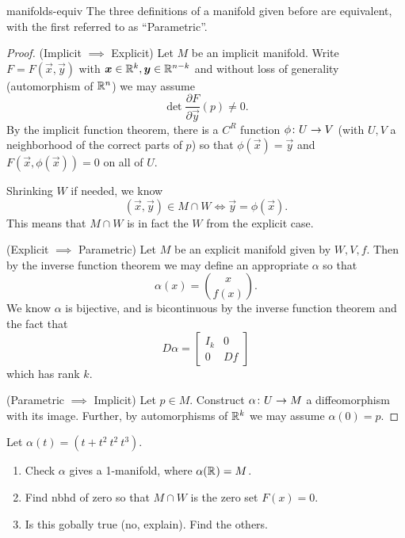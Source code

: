 \documentclass{article}
\begin{document}
\begin{theorem}{}{manifolds-equiv}
  The three definitions of a manifold given before are equivalent,
  with the first referred to as ``Parametric''.
\end{theorem}
\begin{proof}
  (Implicit $\implies$ Explicit)
  Let $M$ be an implicit manifold.
  Write $F = F(\vec{x}, \vec{y})$ with $\vec{x} \in \RR[k], \vec{y} \in \RR[n - k]$
  and without loss of generality (automorphism of $\RR[n]$) we may assume
  \[ \det \frac{\partial F}{\partial \vec{y}}(p) \ne 0. \]
  By the implicit function theorem, there is a $C^{R}$ function $\phi \from U \to V$
  (with $U, V$ a neighborhood of the correct parts of $p$)
  so that $\phi(\vec{x}) = \vec{y}$ and $F(\vec{x}, \phi(\vec{x})) = 0$ on all of $U$.

  Shrinking $W$ if needed, we know
  \[ (\vec{x}, \vec{y}) \in M \cap W \iff \vec{y} = \phi(\vec{x}). \]
  This means that $M \cap W$ is in fact the $W$ from the explicit case.

  (Explicit $\implies$ Parametric)
  Let $M$ be an explicit manifold given by $W, V, f$.
  Then by the inverse function theorem we may define an appropriate $\alpha$ so that
  \[ \alpha(x) = \binom{x}{f(x)}. \]
  We know $\alpha$ is bijective, and is bicontinuous by the inverse function theorem
  and the fact that
  \[ D\alpha = \begin{bmatrix} I_{k} & 0\\ 0 & Df \end{bmatrix} \]
  which has rank $k$.

  (Parametric $\implies$ Implicit)
  Let $p \in M$. Construct $\alpha \from U \to M$ a diffeomorphism with its image.
  Further, by automorphisms of $\RR[k]$ we may assume $\alpha(0) = p$.
\end{proof}

\begin{example}{}{}
  Let $\alpha(t) = (t + t^{2} \ t^{2} \ t^{3})$.
  \begin{enumerate}[start=1,label={\arabic*\rparen}]
    \item Check $\alpha$ gives a 1-manifold, where $\alpha(\RR) = M$.
    \item Find nbhd of zero so that $M \cap W$ is the zero set $F(x) = 0$.
    \item Is this gobally true (no, explain). Find the others.
  \end{enumerate}
\end{example}
\end{document}

